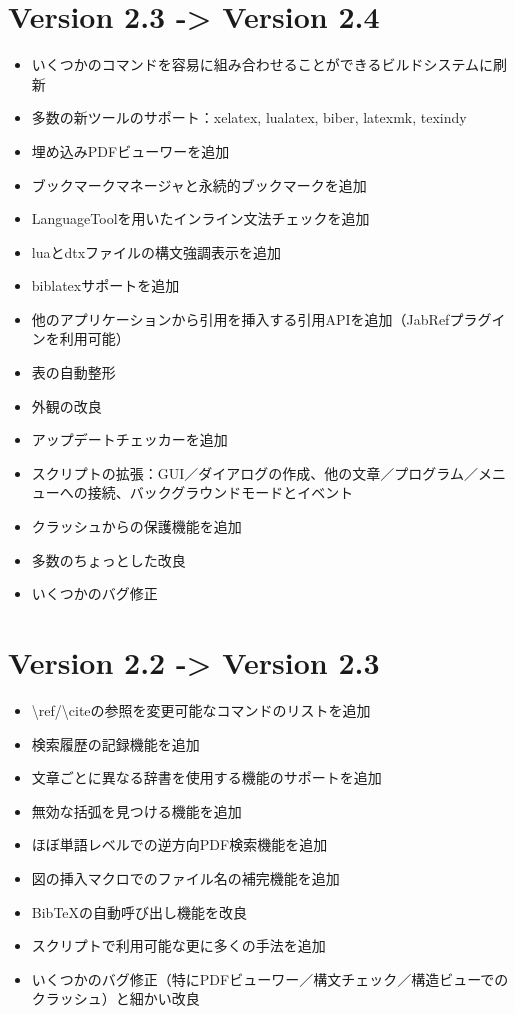 \documentclass[]{book}
\begin{document}
\section{Version 2.3 -\textgreater{} Version 2.4}

\begin{itemize}
\item
  いくつかのコマンドを容易に組み合わせることができるビルドシステムに刷新
\item
  多数の新ツールのサポート：xelatex, lualatex, biber, latexmk, texindy
\item
  埋め込みPDFビューワーを追加
\item
  ブックマークマネージャと永続的ブックマークを追加
\item
  LanguageToolを用いたインライン文法チェックを追加
\item
  luaとdtxファイルの構文強調表示を追加
\item
  biblatexサポートを追加
\item
  他のアプリケーションから引用を挿入する引用APIを追加（JabRefプラグインを利用可能）
\item
  表の自動整形
\item
  外観の改良
\item
  アップデートチェッカーを追加
\item
  スクリプトの拡張：GUI／ダイアログの作成、他の文章／プログラム／メニューへの接続、バックグラウンドモードとイベント
\item
  クラッシュからの保護機能を追加
\item
  多数のちょっとした改良
\item
  いくつかのバグ修正
\end{itemize}

\section{Version 2.2 -\textgreater{} Version 2.3}

\begin{itemize}
\item
  \textbackslash{}ref/\textbackslash{}citeの参照を変更可能なコマンドのリストを追加
\item
  検索履歴の記録機能を追加
\item
  文章ごとに異なる辞書を使用する機能のサポートを追加
\item
  無効な括弧を見つける機能を追加
\item
  ほぼ単語レベルでの逆方向PDF検索機能を追加
\item
  図の挿入マクロでのファイル名の補完機能を追加
\item
  BibTeXの自動呼び出し機能を改良
\item
  スクリプトで利用可能な更に多くの手法を追加
\item
  いくつかのバグ修正（特にPDFビューワー／構文チェック／構造ビューでのクラッシュ）と細かい改良
\end{itemize}
\end{document}
